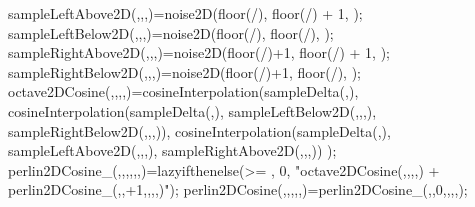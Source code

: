 \documentclass[hyperref={pdfpagelabels=false}]{beamer}
\begin{document}
{{    sampleLeftAbove2D(\x,\y,\periode,\octave)=noise2D(floor(\x/\periode), floor(\y/\periode) + 1, \octave);
    sampleLeftBelow2D(\x,\y,\periode,\octave)=noise2D(floor(\x/\periode), floor(\y/\periode), \octave);
    sampleRightAbove2D(\x,\y,\periode,\octave)=noise2D(floor(\x/\periode)+1, floor(\y/\periode) + 1, \octave);
    sampleRightBelow2D(\x,\y,\periode,\octave)=noise2D(floor(\x/\periode)+1, floor(\y/\periode), \octave);
    octave2DCosine(\x,\y,\octave,\periode,\amplitude)=\amplitude*cosineInterpolation(sampleDelta(\y,\periode),
    cosineInterpolation(sampleDelta(\x,\periode), sampleLeftBelow2D(\x,\y,\periode,\octave), sampleRightBelow2D(\x,\y,\periode,\octave)),
    cosineInterpolation(sampleDelta(\x,\periode), sampleLeftAbove2D(\x,\y,\periode,\octave), sampleRightAbove2D(\x,\y,\periode,\octave))
    );
    perlin2DCosine_(\x,\y,\octave,\periode,\octaves,\persistance,\amplitude)=lazyifthenelse(\octave >= \octaves, 0, "octave2DCosine(\x,\y,\octave,\periode,\amplitude) + perlin2DCosine_(\x,\y,\octave+1,,\octaves,\persistance,\amplitude*\persistance)");
    perlin2DCosine(\x,\y,\periode,\octaves,\persistance,\amplitude)=perlin2DCosine_(\x,\y,0,\periode,\octaves,\persistance,\amplitude);
  }
}
\end{document}
